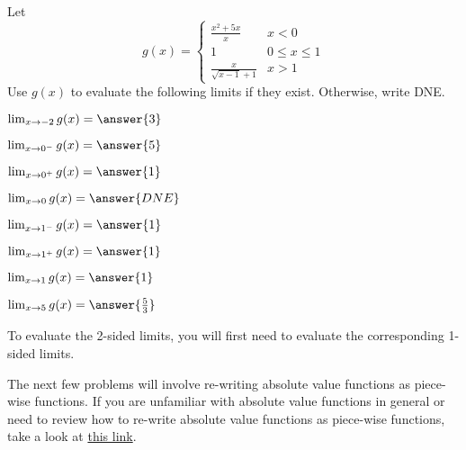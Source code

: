 \documentclass[handout]{ximera}
\begin{document}
\begin{exercise}
Let
\[
g(x) = \begin{cases}
  \frac{x^2+5x}{x}  & x<0 \\
  1 & 0 \leq x \leq 1 \\
  \frac{x}{\sqrt{x-1} +1} & x>1
\end{cases}
\]
Use $g(x)$ to evaluate the following limits if they exist.  Otherwise, write DNE.

\begin{itemize}

\begin{multicols}{2}

\item [] $\lim_{x \to -2} g(x) = \answer{3}$

\item [] $\lim_{x \to 0^-} g(x) = \answer{5}$

\item [] $\lim_{x \to 0^+} g(x) = \answer{1}$

\item [] $\lim_{x \to 0} g(x) = \answer{DNE}$

\item [] $\lim_{x \to 1^-} g(x) = \answer{1}$

\item [] $\lim_{x \to 1^+} g(x) = \answer{1}$

\item [] $\lim_{x \to 1} g(x) = \answer{1}$

\item [] $\lim_{x \to 5} g(x) = \answer{\frac{5}{3}}$

\end{multicols}

\end{itemize}

\begin{hint}

To evaluate the 2-sided limits, you will first need to evaluate the corresponding 1-sided limits. 

\end{hint}

\end{exercise}

The next few problems will involve re-writing absolute value functions as piece-wise functions.  If you are unfamiliar with absolute value functions in general or need to review how to re-write absolute value functions as piece-wise functions, take a look at \href{https://www.youtube.com/watch?v=71SfBO-B4dE}{this link}.
\end{document}
